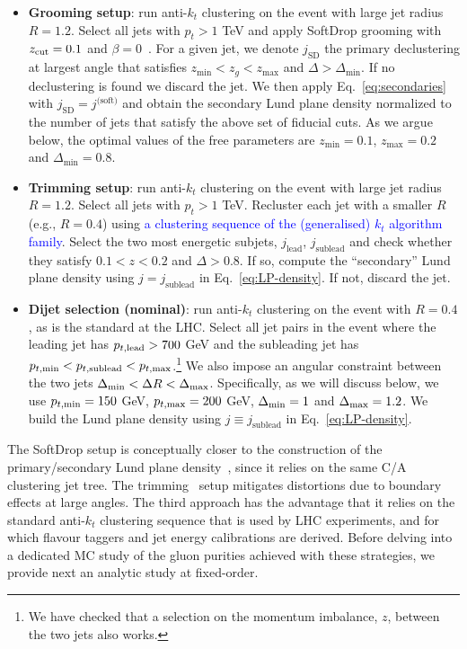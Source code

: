 \documentclass[a4paper,11pt]{article}
\begin{document}
\begin{itemize}
    \item \textbf{Grooming setup}: run anti-$k_t$ clustering \cite{Cacciari:2008gp} on the event with large jet radius $R = 1.2$. Select all jets with $p_t > 1 $ TeV and apply SoftDrop grooming with $z_{\rm{cut}} = 0.1$ and $\beta = 0$~\cite{Dasgupta:2013ihk,Larkoski:2014wba}. For a given jet, we denote $j_{\text{SD}}$ the primary declustering at largest angle that satisfies $z_{\text{min}} <z_g< z_{\text{max}}$ and $\Delta > \Delta_{\text{min}}$. If no declustering is found we discard the jet. We then apply Eq.~\eqref{eq:secondaries} with $j_{\text{SD}}=j^{\text{(soft)}}$ and obtain the secondary Lund plane density normalized to the number of jets that satisfy the above set of fiducial cuts.  
    As we argue below, the optimal values of the free parameters are $z_{\text {min}}=0.1$, $z_{\text {max}}=0.2$ and $\Delta_{\text{min}}=0.8$.
    \item \textbf{Trimming setup}: run anti-$k_t$ clustering on the event with large jet radius $R = 1.2$. Select all jets with $p_t > 1 $ TeV. Recluster each jet with a smaller $R$ (e.g., $R = 0.4$) using \textcolor{blue}{a clustering sequence of the (generalised) $k_t$ algorithm family}. Select the two most energetic subjets, $j_{\text {lead}}$, $j_{\text{sublead}}$ and check whether they satisfy $0.1 < z < 0.2$ and $\Delta > 0.8$. If so, compute the ``secondary'' Lund plane density using $j=j_{\text{sublead}}$ in Eq.~\eqref{eq:LP-density}. If not, discard the jet. 
    \item \textbf{Dijet selection (nominal)}: run anti-$k_t$ clustering on the event with $R = 0.4$, as is the standard at the LHC. Select all jet pairs in the event where the leading jet has $p_{t,{\rm lead}} > 700$ GeV and the subleading jet has $p_{t,{\rm min}} < p_{t,{\rm sublead}} < p_{t,{\rm max}}$.\footnote{We have checked that a selection on the momentum imbalance, $z$, between the two jets also works.} We also impose an angular constraint between the two jets $\Delta_{\rm min} < \Delta R < \Delta_{\rm max}$. Specifically, as we will discuss below, we use  $p_{t,{\rm min}}=150$ GeV, $p_{t,{\rm max}}=200$ GeV, $\Delta_{\rm min} = 1$ and $\Delta_{\rm max} = 1.2$.
    We build the Lund plane density using $j\equiv j_\text{sublead}$ in Eq.~\eqref{eq:LP-density}.
\end{itemize}

The SoftDrop setup is conceptually closer to the construction of the primary/secondary Lund plane density~\cite{Dreyer:2018nbf}, since it relies on the same C/A clustering jet tree. The trimming~\cite{Krohn:2009th} setup mitigates distortions due to boundary effects at large angles. The third approach has the advantage that it relies on the standard anti-$k_t$ clustering sequence that is used by LHC experiments, and for which flavour taggers and jet energy calibrations are derived. Before delving into a dedicated MC study of the gluon purities achieved with these strategies, we provide next an analytic study at fixed-order.   
\end{document}
